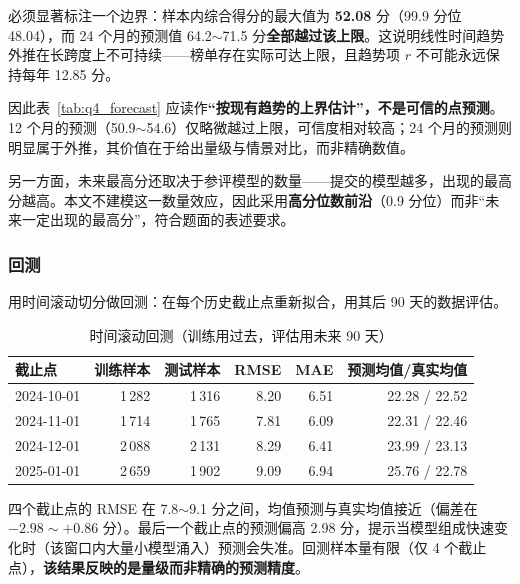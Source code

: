 必须显著标注一个边界：样本内综合得分的最大值为 \textbf{52.08} 分（99.9 分位 48.04），而 24 个月的预测值 64.2$\sim$71.5 分\textbf{全部越过该上限}。这说明线性时间趋势外推在长跨度上不可持续——榜单存在实际可达上限，且趋势项 $r$ 不可能永远保持每年 12.85 分。

因此表~\ref{tab:q4_forecast} 应读作\textbf{``按现有趋势的上界估计''，不是可信的点预测}。12 个月的预测（50.9$\sim$54.6）仅略微越过上限，可信度相对较高；24 个月的预测则明显属于外推，其价值在于给出量级与情景对比，而非精确数值。

另一方面，未来最高分还取决于参评模型的数量——提交的模型越多，出现的最高分越高。本文不建模这一数量效应，因此采用\textbf{高分位数前沿}（0.9 分位）而非``未来一定出现的最高分''，符合题面的表述要求。

\subsubsection{回测}

用时间滚动切分做回测：在每个历史截止点重新拟合，用其后 90 天的数据评估。

\begin{table}[htbp]
\centering
\caption{时间滚动回测（训练用过去，评估用未来 90 天）}
\label{tab:q4_backtest}
\small
\begin{tabular}{l|r|r|r|r|r}
\toprule
\textbf{截止点} & \textbf{训练样本} & \textbf{测试样本} & \textbf{RMSE} & \textbf{MAE} & \textbf{预测均值/真实均值} \\
\midrule
2024-10-01 & 1\,282 & 1\,316 & 8.20 & 6.51 & 22.28 / 22.52 \\
2024-11-01 & 1\,714 & 1\,765 & 7.81 & 6.09 & 22.31 / 22.46 \\
2024-12-01 & 2\,088 & 2\,131 & 8.29 & 6.41 & 23.99 / 23.13 \\
2025-01-01 & 2\,659 & 1\,902 & 9.09 & 6.94 & 25.76 / 22.78 \\
\bottomrule
\end{tabular}
\end{table}

四个截止点的 RMSE 在 7.8$\sim$9.1 分之间，均值预测与真实均值接近（偏差在 $-2.98\sim+0.86$ 分）。最后一个截止点的预测偏高 2.98 分，提示当模型组成快速变化时（该窗口内大量小模型涌入）预测会失准。回测样本量有限（仅 4 个截止点），\textbf{该结果反映的是量级而非精确的预测精度}。
